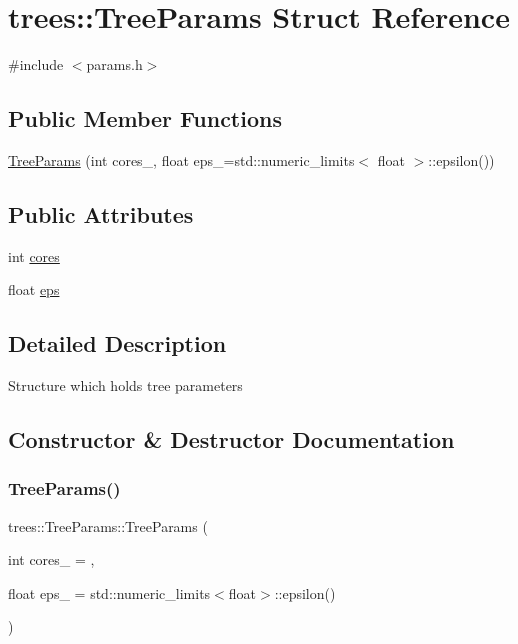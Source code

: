 \hypertarget{structtrees_1_1_tree_params}{}\section{trees\+:\+:Tree\+Params Struct Reference}
\label{structtrees_1_1_tree_params}


{\ttfamily \#include $<$params.\+h$>$}

\subsection*{Public Member Functions}
\begin{DoxyCompactItemize}
\item 
\hyperlink{structtrees_1_1_tree_params_a0f5ed74837938da3ff41a8c95a6edfd8}{Tree\+Params} (int cores\+\_, float eps\+\_\+=std\+::numeric\+\_\+limits$<$ float $>$\+::epsilon())
\end{DoxyCompactItemize}
\subsection*{Public Attributes}
\begin{DoxyCompactItemize}
\item 
int \hyperlink{structtrees_1_1_tree_params_a5ef0f40ea5395de102678757741c65c6}{cores}
\item 
float \hyperlink{structtrees_1_1_tree_params_abeaacd2b7ddb9f7345595f90a3926176}{eps}
\end{DoxyCompactItemize}


\subsection{Detailed Description}
Structure which holds tree parameters 

\subsection{Constructor \& Destructor Documentation}
\mbox{\label{structtrees_1_1_tree_params_a0f5ed74837938da3ff41a8c95a6edfd8}} 
\subsubsection{\texorpdfstring{Tree\+Params()}{TreeParams()}}
{\footnotesize\ttfamily trees\+::\+Tree\+Params\+::\+Tree\+Params (\begin{DoxyParamCaption}\item[{int}]{cores\+\_\+ = {},  }\item[{float}]{eps\+\_\+ = {\ttfamily std\+:\+:numeric\+\_\+limits$<$float$>$\+:\+:epsilon()} }\end{DoxyParamCaption})\hspace{0.3cm}{\ttfamily [inline]}}

